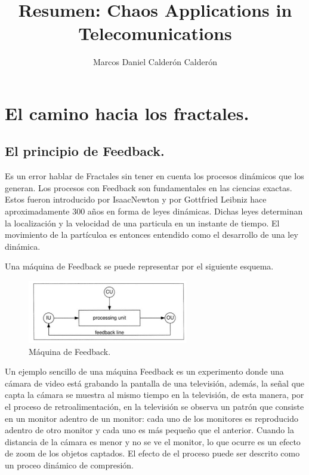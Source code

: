 \documentclass[prodmode,acmtap]{acmlarge}
\title{Resumen:  Chaos Applications in Telecomunications}
\author{Marcos Daniel Calderón Calderón \affil{CIMAT}
}
\begin{document}
\maketitle

\section{El camino hacia los fractales.}

\subsection{El principio de Feedback.}


Es un error hablar de Fractales sin tener en cuenta los procesos dinámicos que los generan. 
Los procesos con Feedback son fundamentales en las ciencias exactas. Estos fueron introducido por IsaacNewton y por Gottfried Leibniz hace aproximadamente 300 años en forma de leyes dinámicas.  Dichas leyes determinan la localización y la velocidad de una particula en un instante de tiempo. El movimiento de la partículoa es entonces entendido como el desarrollo de una ley dinámica. 

Una máquina de Feedback se puede representar por el siguiente esquema.

\begin{figure}[H]
\centering
\includegraphics[width=7cm]{fe.png}
\caption{Máquina de Feedback.}
\label{fo}
\end{figure}


Un ejemplo sencillo de una máquina Feedback es un experimento donde una cámara de video está grabando la pantalla de una televisión, además, la señal que capta la cámara se muestra al mismo tiempo en la televisión, de esta manera, por el proceso de retroalimentación, en la televisión se observa un patrón que consiste en un monitor adentro de un monitor: cada uno de los monitores es reproducido adentro de otro monitor y cada uno es más pequeño que el anterior.
Cuando la distancia de la cámara es menor y no se ve el monitor, lo que ocurre es un efecto de zoom de los objetos captados. El efecto de el proceso puede ser descrito como un proceo dinámico de compresión. 
\end{document}
